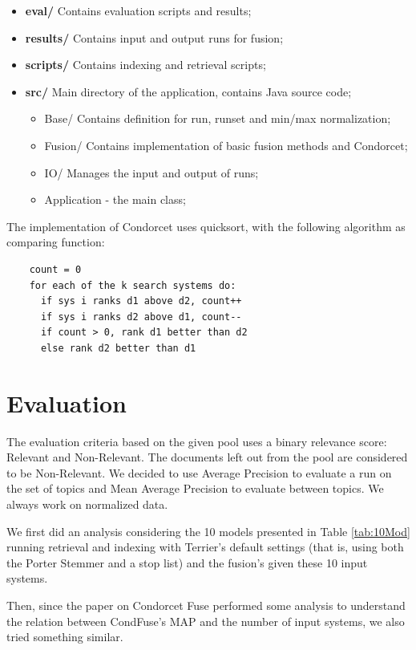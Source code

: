 	\begin{itemize}
	\item \textbf{eval/} Contains evaluation scripts and results;
	\item \textbf{results/} Contains input and output runs for fusion;
	\item \textbf{scripts/} Contains indexing and retrieval scripts;
	\item \textbf{src/} Main directory of the application, contains Java source code;
		\begin{itemize}
		\item Base/ Contains definition for run, runset and min/max normalization;
		\item Fusion/ Contains implementation of basic fusion methods and Condorcet;
		\item IO/ Manages the input and output of runs;
		\item Application - the main class;
		\end{itemize}
	\end{itemize}

    The implementation of Condorcet uses quicksort, with the following algorithm
	as comparing function:

	\begin{lstlisting}
	count = 0
	for each of the k search systems do:
	  if sys i ranks d1 above d2, count++
	  if sys i ranks d2 above d1, count--
	  if count > 0, rank d1 better than d2
	  else rank d2 better than d1
	\end{lstlisting}

    \section{Evaluation}

	The evaluation criteria based on the given pool uses a binary relevance score:
	Relevant and Non-Relevant.
	The documents left out from the pool are considered to be Non-Relevant.
	We decided to use Average Precision to evaluate a run on the set of topics and Mean Average Precision to evaluate between topics. We always work on normalized data.
	
	We first did an analysis considering the 10 models presented in Table \ref{tab:10Mod} running retrieval and indexing with Terrier's default settings (that is, using both the Porter Stemmer and a stop list) and the fusion's given these 10 input systems.
	
	Then, since the paper on Condorcet Fuse performed some analysis to understand the relation between CondFuse's MAP and the number of input systems, we also tried something similar. 
	
